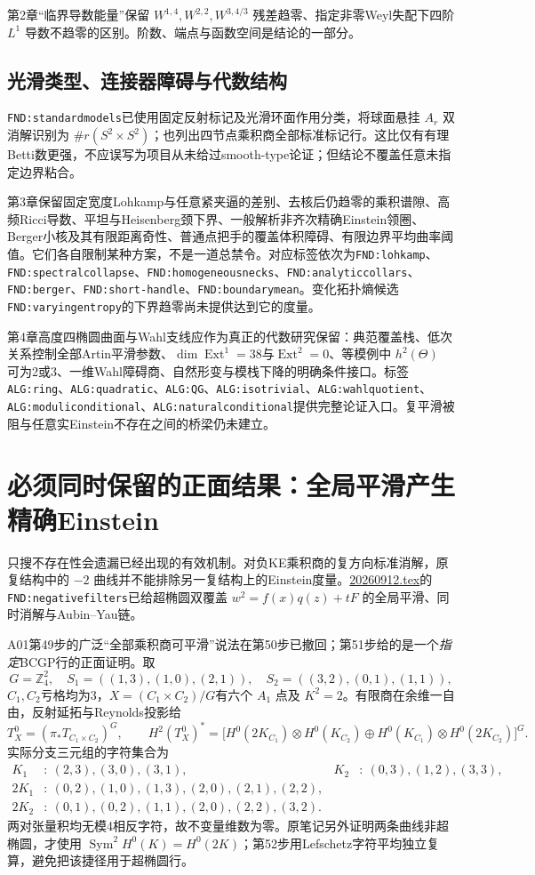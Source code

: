 \documentclass[UTF8,a4paper,11pt,fontset=fandol]{ctexart}
\numberwithin{equation}{section}
\theoremstyle{definition}
\newcommand{\Z}{\mathbb Z}
\begin{document}
第2章“临界导数能量”保留
$W^{1,4},W^{2,2},W^{3,4/3}$ 残差趋零、指定非零Weyl失配下四阶 $L^1$ 导数不趋零的区别。阶数、端点与函数空间是结论的一部分。

\subsection{光滑类型、连接器障碍与代数结构}
\texttt{FND:standardmodels}已使用固定反射标记及光滑环面作用分类，将球面悬挂 $A_r$ 双消解识别为 $\#r(S^2\times S^2)$；也列出四节点乘积商全部标准标记行。这比仅有有理Betti数更强，不应误写为项目从未给过smooth-type论证；但结论不覆盖任意未指定边界粘合。

第3章保留固定宽度Lohkamp与任意紧夹逼的差别、去核后仍趋零的乘积谱隙、高频Ricci导数、平坦与Heisenberg颈下界、一般解析非齐次精确Einstein领圈、Berger小核及其有限距离奇性、普通点把手的覆盖体积障碍、有限边界平均曲率阈值。它们各自限制某种方案，不是一道总禁令。对应标签依次为\texttt{FND:lohkamp}、\texttt{FND:spectralcollapse}、\texttt{FND:homogeneousnecks}、\texttt{FND:analyticcollars}、\texttt{FND:berger}、\texttt{FND:short-handle}、\texttt{FND:boundarymean}。变化拓扑熵候选\texttt{FND:varyingentropy}的下界趋零尚未提供达到它的度量。

第4章高度四椭圆曲面与Wahl支线应作为真正的代数研究保留：典范覆盖栈、低次关系控制全部Artin平滑参数、$\dim\operatorname{Ext}^1=38$与$\operatorname{Ext}^2=0$、等模例中 $h^2(\Theta)$ 可为2或3、一维Wahl障碍商、自然形变与模栈下降的明确条件接口。标签\texttt{ALG:ring}、\texttt{ALG:quadratic}、\texttt{ALG:QG}、\texttt{ALG:isotrivial}、\texttt{ALG:wahlquotient}、\texttt{ALG:moduliconditional}、\texttt{ALG:naturalconditional}提供完整论证入口。复平滑被阻与任意实Einstein不存在之间的桥梁仍未建立。

\section{必须同时保留的正面结果：全局平滑产生精确Einstein}
只搜不存在性会遗漏已经出现的有效机制。对负KE乘积商的复方向标准消解，原复结构中的 $-2$ 曲线并不能排除另一复结构上的Einstein度量。\href{20260912.tex}{20260912.tex}的\texttt{FND:negativefilters}已给超椭圆双覆盖
$w^2=f(x)q(z)+tF$ 的全局平滑、同时消解与Aubin--Yau链。

A01第49步的广泛“全部乘积商可平滑”说法在第50步已撤回；第51步给的是一个\emph{指定}BCGP行的正面证明。取
\[
G=\Z_4^2,\quad S_1=((1,3),(1,0),(2,1)),
\quad S_2=((3,2),(0,1),(1,1)),
\]
$C_1,C_2$亏格均为3，$X=(C_1\times C_2)/G$有六个 $A_1$ 点及 $K^2=2$。有限商在余维一自由，反射延拓与Reynolds投影给
\[
T_X^0=(\pi_*T_{C_1\times C_2})^G,
\qquad
H^2(T_X^0)^*=
\bigl[H^0(2K_{C_1})\otimes H^0(K_{C_2})
\oplus H^0(K_{C_1})\otimes H^0(2K_{C_2})\bigr]^G.
\]
实际分支三元组的字符集合为
\begin{align*}
K_1&:\ (2,3),(3,0),(3,1),& K_2&:\ (0,3),(1,2),(3,3),\\
2K_1&:\ (0,2),(1,0),(1,3),(2,0),(2,1),(2,2),\\
2K_2&:\ (0,1),(0,2),(1,1),(2,0),(2,2),(3,2).
\end{align*}
两对张量积均无模4相反字符，故不变量维数为零。原笔记另外证明两条曲线非超椭圆，才使用 $\operatorname{Sym}^2H^0(K)=H^0(2K)$；第52步用Lefschetz字符平均独立复算，避免把该捷径用于超椭圆行。
\end{document}
